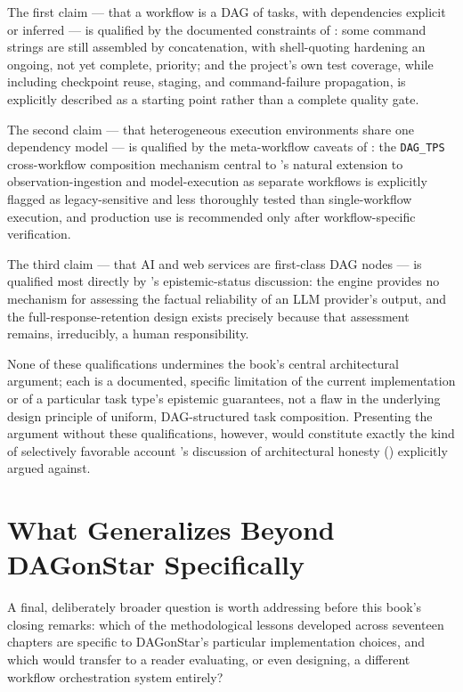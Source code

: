 The first claim --- that a workflow is a DAG of tasks, with dependencies
explicit or inferred --- is qualified by the documented constraints of
: some command strings are still assembled by
concatenation, with shell-quoting hardening an ongoing, not yet complete,
priority; and the project's own test coverage, while including checkpoint
reuse, staging, and command-failure propagation, is explicitly described as
a starting point rather than a complete quality gate.

The second claim --- that heterogeneous execution environments share one
dependency model --- is qualified by the meta-workflow caveats of
: the \texttt{DAG\_TPS} cross-workflow composition
mechanism central to 's natural extension to
observation-ingestion and model-execution as separate workflows is
explicitly flagged as legacy-sensitive and less thoroughly tested than
single-workflow execution, and production use is recommended only after
workflow-specific verification.

The third claim --- that AI and web services are first-class DAG nodes ---
is qualified most directly by 's epistemic-status
discussion: the engine provides no mechanism for assessing the factual
reliability of an LLM provider's output, and the full-response-retention
design exists precisely because that assessment remains, irreducibly, a
human responsibility.

\begin{cautionbox}
None of these qualifications undermines the book's central architectural
argument; each is a documented, specific limitation of the current
implementation or of a particular task type's epistemic guarantees, not a
flaw in the underlying design principle of uniform, DAG-structured task
composition. Presenting the argument without these qualifications, however,
would constitute exactly the kind of selectively favorable account
's discussion of architectural honesty
() explicitly argued against.
\end{cautionbox}

\section{What Generalizes Beyond DAGonStar Specifically}

A final, deliberately broader question is worth addressing before this
book's closing remarks: which of the methodological lessons developed
across seventeen chapters are specific to DAGonStar's particular
implementation choices, and which would transfer to a reader evaluating, or
even designing, a different workflow orchestration system entirely?

